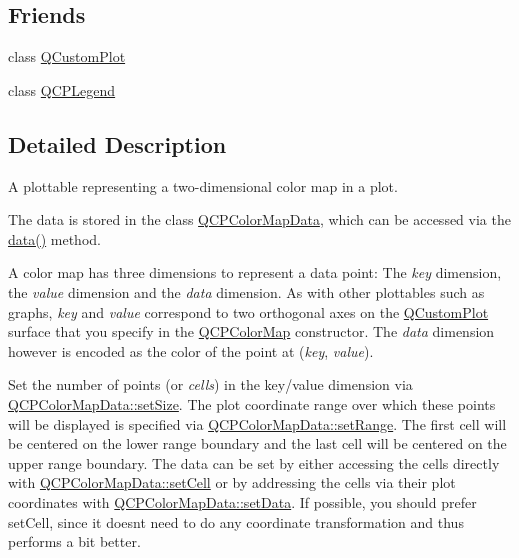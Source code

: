 \subsection*{Friends}
\begin{DoxyCompactItemize}
\item 
class \hyperlink{class_q_c_p_color_map_a1cdf9df76adcfae45261690aa0ca2198}{Q\+Custom\+Plot}
\item 
class \hyperlink{class_q_c_p_color_map_a8429035e7adfbd7f05805a6530ad5e3b}{Q\+C\+P\+Legend}
\end{DoxyCompactItemize}


\subsection{Detailed Description}
A plottable representing a two-\/dimensional color map in a plot. 



The data is stored in the class \hyperlink{class_q_c_p_color_map_data}{Q\+C\+P\+Color\+Map\+Data}, which can be accessed via the \hyperlink{class_q_c_p_color_map_a047d7eb3ae657f93f2f39b5e68b79451}{data()} method.

A color map has three dimensions to represent a data point\+: The {\itshape key} dimension, the {\itshape value} dimension and the {\itshape data} dimension. As with other plottables such as graphs, {\itshape key} and {\itshape value} correspond to two orthogonal axes on the \hyperlink{class_q_custom_plot}{Q\+Custom\+Plot} surface that you specify in the \hyperlink{class_q_c_p_color_map}{Q\+C\+P\+Color\+Map} constructor. The {\itshape data} dimension however is encoded as the color of the point at ({\itshape key}, {\itshape value}).

Set the number of points (or {\itshape cells}) in the key/value dimension via \hyperlink{class_q_c_p_color_map_data_a0d9ff35c299d0478b682bfbcdd9c097e}{Q\+C\+P\+Color\+Map\+Data\+::set\+Size}. The plot coordinate range over which these points will be displayed is specified via \hyperlink{class_q_c_p_color_map_data_aad9c1c7c703c1339489fc730517c83d4}{Q\+C\+P\+Color\+Map\+Data\+::set\+Range}. The first cell will be centered on the lower range boundary and the last cell will be centered on the upper range boundary. The data can be set by either accessing the cells directly with \hyperlink{class_q_c_p_color_map_data_a8e75eaf8746596319032a93f3d2d0683}{Q\+C\+P\+Color\+Map\+Data\+::set\+Cell} or by addressing the cells via their plot coordinates with \hyperlink{class_q_c_p_color_map_data_afd2083ccfd6987ec94aa7ef8e91ca39a}{Q\+C\+P\+Color\+Map\+Data\+::set\+Data}. If possible, you should prefer set\+Cell, since it doesn\textquotesingle{}t need to do any coordinate transformation and thus performs a bit better.

